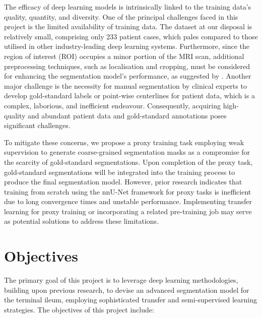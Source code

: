 The efficacy of deep learning models is intrinsically linked to the training data's quality, quantity, and diversity. One of the principal challenges faced in this project is the limited availability of training data. The dataset at our disposal is relatively small, comprising only 233 patient cases, which pales compared to those utilised in other industry-leading deep learning systems. Furthermore, since the region of interest (ROI) occupies a minor portion of the MRI scan, additional preprocessing techniques, such as localisation and cropping, must be considered for enhancing the segmentation model's performance, as suggested by \cite{Ali2022}. Another major challenge is the necessity for manual segmentation by clinical experts to develop gold-standard labels or point-wise centerlines for patient data, which is a complex, laborious, and inefficient endeavour. Consequently, acquiring high-quality and abundant patient data and gold-standard annotations poses significant challenges.

To mitigate these concerns, we propose a proxy training task employing weak supervision to generate coarse-grained segmentation masks as a compromise for the scarcity of gold-standard segmentations. Upon completion of the proxy task, gold-standard segmentations will be integrated into the training process to produce the final segmentation model. However, prior research \cite{Ali2022} indicates that training from scratch using the nnU-Net framework for proxy tasks is inefficient due to long convergence times and unstable performance. Implementing transfer learning for proxy training \cite{jang2021effectiveness} or incorporating a related pre-training job may serve as potential solutions to address these limitations.

\section{Objectives}

The primary goal of this project is to leverage deep learning methodologies, building upon previous research, to devise an advanced segmentation model for the terminal ileum, employing sophisticated transfer and semi-supervised learning strategies. The objectives of this project include:

